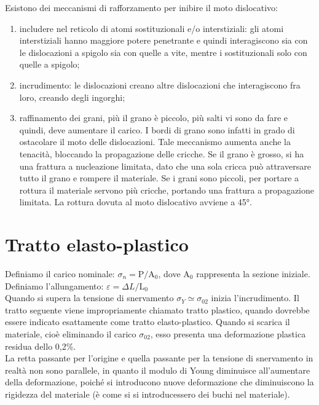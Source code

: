 Esistono dei meccanismi di rafforzamento per inibire il moto dislocativo:
\begin{enumerate}
    \item  includere nel reticolo di atomi sostituzionali e/o interstiziali: gli atomi interstiziali hanno maggiore potere penetrante e quindi interagiscono sia con le dislocazioni a spigolo sia con quelle a vite, mentre i sostituzionali solo con quelle a spigolo;
    \item incrudimento: le dislocazioni creano altre dislocazioni che interagiscono fra loro, creando degli ingorghi;
    \item  raffinamento dei grani, più il grano è piccolo, più salti vi sono da fare e quindi, deve aumentare il carico. I bordi di grano sono infatti in grado di ostacolare il moto delle dislocazioni. Tale meccanismo aumenta anche la tenacità, bloccando la propagazione delle cricche. Se il grano è grosso, si ha una frattura a nucleazione limitata, dato che una sola cricca può attraversare tutto il grano e rompere il materiale. Se i grani sono piccoli, per portare a rottura il materiale servono più cricche, portando una frattura a propagazione limitata. La rottura dovuta al moto dislocativo avviene a 45°.
\end{enumerate}

\section{Tratto elasto-plastico}

Definiamo il carico nominale: $\sigma_n=\mathrm{P/A_0}$, dove $\mathrm{A_0}$ rappresenta la sezione iniziale.
Definiamo l’allungamento: $\varepsilon=\Delta L/\mathrm{L_0}$\\
Quando si supera la tensione di snervamento $\sigma_Y\simeq\sigma_{02}$ inizia l’incrudimento.
Il tratto seguente viene impropriamente chiamato tratto plastico, quando dovrebbe essere indicato esattamente come tratto elasto-plastico. Quando si scarica il materiale, cioè eliminando il carico $\sigma_{02}$, esso presenta una deformazione plastica residua dello 0,2\%.\\
La retta passante per l’origine e quella passante per la tensione di snervamento in realtà non sono parallele, in quanto il modulo di Young diminuisce all’aumentare della deformazione, poiché si introducono nuove deformazione che diminuiscono la rigidezza del materiale (è come si si introducessero dei buchi nel materiale).

